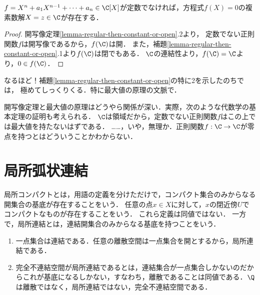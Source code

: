 \documentclass[uplatex,dvipdfmx]{jsreport}
\begin{document}
\begin{theorem}
    $f=X^n+a_1X^{n-1}+\cdots+a_n\in\C[X]$が定数でなければ，方程式$f(X)=0$の複素数解$X=z\in\C$が存在する．
\end{theorem}
\begin{proof}
    開写像定理\ref{lemma-regular-then-constant-or-open}.2より，
    定数でない正則関数$f$は開写像であるから，$f(\C)$は開．
    また，補題\ref{lemma-regular-then-constant-or-open}.1より$f(\C)$は閉でもある．
    $\C$の連結性より，$f(\C)=\C$より，$0\in f(\C)$．
\end{proof}
\begin{remarks}[$f(\C)=\C$があまりに美しい]
    なるほど！補題\ref{lemma-regular-then-constant-or-open}の特に2を示したのちでは，
    極めてしっくりくる．特に最大値の原理の文脈で．
    
    開写像定理と最大値の原理はどうやら関係が深い．実際，次のような代数学の基本定理の証明も考えられる．
    $\C$は領域だから，定数でない正則関数$f$はこの上では最大値を持たないはずである．
    ……，いや，無理か．正則関数$f:\C\to\C$が零点を持つとはどういうことかわからない．
\end{remarks}

\section{局所弧状連結}

\begin{tcolorbox}[colframe=ForestGreen, colback=ForestGreen!10!white, breakable ,colbacktitle=ForestGreen!40!white, coltitle=black,fonttitle=\bfseries\sffamily,
    title=compact-Hausdorff空間という聖域の構成の試み]
    局所コンパクトとは，用語の定義を分けただけで，コンパクト集合のみからなる開集合の基底が存在することをいう．
    任意の点$x\in X$に対して，$x$の閉近傍$U$でコンパクトなものが存在することをいう．
    これら定義は同値ではない．
    一方で，局所連結とは，連結開集合のみからなる基底を持つことをいう．
\end{tcolorbox}

\begin{example}\mbox{}
    \begin{enumerate}
        \item 一点集合は連結である．任意の離散空間は一点集合を開とするから，局所連結である．
        \item 完全不連結空間が局所連結であるとは，連結集合が一点集合しかないのだからこれが基底になるしかない，すなわち，離散であることは同値である．$\Q$は離散ではなく，局所連結ではない，完全不連結空間である．
    \end{enumerate}
\end{example}
\end{document}
